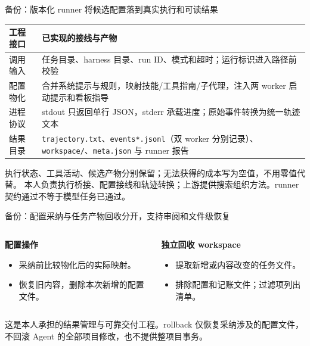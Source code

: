 \documentclass[aspectratio=169,10pt]{beamer}
\newcommand{\src}[1]{\vfill{\fontsize{6.7}{8}\selectfont\color{Muted}#1}\par}
\newcommand{\lead}[1]{{\color{Teal}\large\bfseries #1}\par\medskip}
\begin{document}
\begin{frame}{备份：版本化 runner 将候选配置落到真实执行和可读结果}
\renewcommand{\arraystretch}{1.55}
\begin{tabularx}{\textwidth}{@{}p{2.4cm}Y@{}}
\toprule 工程接口 & 已实现的接线与产物 \\
\midrule
调用输入 & 任务目录、harness 目录、run ID、模式和超时；运行标识进入路径前校验 \\
配置物化 & 合并系统提示与规则，映射技能/工具指南/子代理，注入两 worker 启动提示和看板指导 \\
进程协议 & stdout 只返回单行 JSON，stderr 承载进度；原始事件转换为统一轨迹文本 \\
结果目录 & \texttt{trajectory.txt}、\texttt{events*.jsonl}（双 worker 分别记录）、\texttt{workspace/}、\texttt{meta.json} 与 runner 报告 \\
\bottomrule
\end{tabularx}
\medskip
执行状态、工具活动、候选产物分别保留；无法获得的成本写为空值，不用零值代替。
\src{本人负责执行桥接、配置接线和轨迹转换；上游提供搜索组织方法。runner 契约通过不等于模型任务已通过。}
\end{frame}

\begin{frame}{备份：配置采纳与任务产物回收分开，支持审阅和文件级恢复}
\begin{center}
\end{center}
\medskip
\begin{columns}[T]
\begin{column}{.48\textwidth}
\lead{配置操作}
\begin{itemize}
\item 采纳前比较物化后的实际映射。
\item 恢复旧内容，删除本次新增的配置文件。
\end{itemize}
\end{column}
\begin{column}{.47\textwidth}
\lead{独立回收 workspace}
\begin{itemize}
\item 提取新增或内容改变的任务文件。
\item 排除配置和记账文件；过滤项列出清单。
\end{itemize}
\end{column}
\end{columns}
\src{这是本人承担的结果管理与可靠交付工程。rollback 仅恢复采纳涉及的配置文件，不回滚 Agent 的全部项目修改，也不提供整项目事务。}
\end{frame}
\end{document}
